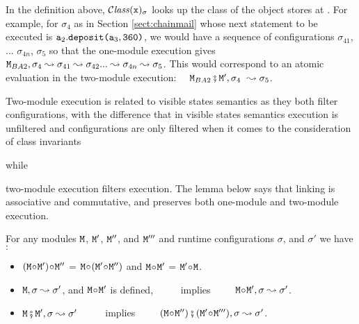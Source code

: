 {In the definition above,  $\ClassOf {\x} {\sigma} $ looks up the class of the object stores at \x{}.
 For example, for $\sigma_4$ as in Section \ref{sect:chainmail} whose next statement to be executed 
 is  $\prg{a}_2.\prg{deposit}{\prg{(}}\prg{a}_3,\prg{360}{\prg{)}}$,  we would have 
 a sequence of configurations $\sigma_{41}$, ... $\sigma_{4n}$,  $\sigma_{5}$ so that the
  one-module execution gives
 $\M_{BA2}, \sigma_4 \leadsto \sigma_{41} \leadsto \sigma_{42} ... \leadsto \sigma_{4n}   \leadsto \sigma_{5}$.
This would correspond to an atomic evaluation in the two-module execution: \  \
 $\M_{BA2}\mkpair \M', \sigma_4 \ \leadsto \sigma_5$.

Two-module execution  is related to %
visible states
semantics \cite{MuellerPoetzsch-HeffterLeavens06} as they both filter configurations, with  the difference
that in visible states semantics %
execution is unfiltered and  configurations are only filtered when it comes to the  consideration 
of class invariants} while {two-module execution filters  execution.
%
The lemma below says  that linking is associative and commutative, and preserves   both one-module and two-module execution.

\begin{lemma}
 For any modules $\M$,   $\M'$, $\M''$, and $\M'''$ and runtime configurations $\sigma$, and $\sigma'$ we have$:$
 \label{lemma:linking:properties}

 \begin{itemize}
     \item
     $(\M \link \M')\link \M''$ = $\M \link (\M' \link \M'')$  \hspace{1cm} and    \hspace{1cm}   $\M \link \M'$  = $\M' \link\M$.
      \item
      $\M, \sigma \leadsto \sigma'$, and $\M\link \M'$ is defined, \  \ \ \ \  implies\ \ \ \ \   $\M\link \M', \sigma \leadsto \sigma'$.
 \item
 $\M \mkpair \M', \sigma \leadsto \sigma'$   \  \ \ \ \  implies\ \ \ \ \  $(\M\link\M'') \mkpair (\M'\link\M''') ,\sigma \leadsto \sigma'$.  
  \end{itemize}

 \end{lemma}
 
}
